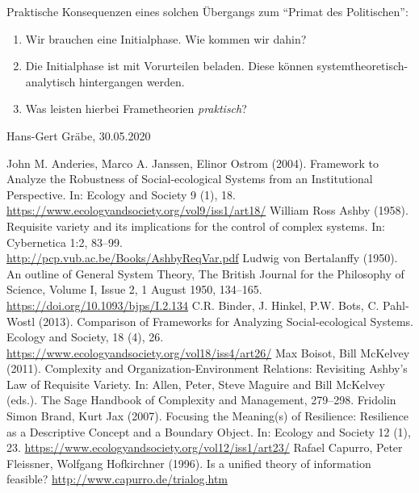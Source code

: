 \documentclass[11pt,a4paper]{article}
\begin{document}
Praktische Konsequenzen eines solchen Übergangs zum ``Primat des
Politischen'':

\begin{enumerate}
[noitemsep]
\item
  Wir brauchen eine Initialphase. Wie kommen wir dahin?
\item
  Die Initialphase ist mit Vorurteilen beladen. Diese können
  systemtheoretisch-analytisch hintergangen werden.
\item
  Was leisten hierbei Frametheorien \emph{praktisch}?
\end{enumerate}

Hans-Gert Gräbe, 30.05.2020

\begin{thebibliography}{xxx}
 John M. Anderies, Marco A. Janssen, Elinor Ostrom
  (2004).  Framework to Analyze the Robustness of Social-ecological Systems
  from an Institutional Perspective. In: Ecology and Society 9 (1),
  18.\\ \url{https://www.ecologyandsociety.org/vol9/iss1/art18/}
 William Ross Ashby (1958).  Requisite variety and its
  implications for the control of complex systems. In: Cybernetica 1:2,
  83--99.\\ \url{http://pcp.vub.ac.be/Books/AshbyReqVar.pdf}
 Ludwig von Bertalanffy (1950). An outline of General
  System Theory, The British Journal for the Philosophy of Science, Volume I,
  Issue 2, 1 August 1950, 134–165.\\
  \url{https://doi.org/10.1093/bjps/I.2.134}
 C.R. Binder, J. Hinkel, P.W. Bots, C. Pahl-Wostl (2013).
  Comparison of Frameworks for Analyzing Social-ecological Systems. Ecology
  and Society, 18 (4), 26.  \\
  \url{https://www.ecologyandsociety.org/vol18/iss4/art26/}
 Max Boisot, Bill McKelvey (2011). Complexity and
  Organization-Environment Relations: Revisiting Ashby’s Law of Requisite
  Variety. In: Allen, Peter, Steve Maguire and Bill McKelvey (eds.). The Sage
  Handbook of Complexity and Management, 279--298. 
 Fridolin Simon Brand, Kurt Jax (2007).  Focusing the
  Meaning(s) of Resilience: Resilience as a Descriptive Concept and a Boundary
  Object. In: Ecology and Society 12 (1), 23.
  \url{https://www.ecologyandsociety.org/vol12/iss1/art23/}
 Rafael Capurro, Peter Fleissner, Wolfgang Hofkirchner
  (1996). Is a unified theory of information feasible?
  \url{http://www.capurro.de/trialog.htm}

\end{thebibliography}
\end{document}
